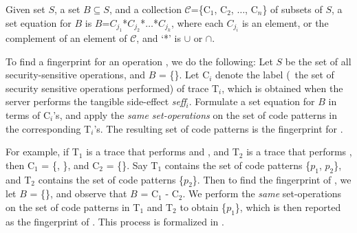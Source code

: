 \begin{definition}
\label{definition:set-equation}
Given set $S$, a set $B\subseteq$$S$, and a collection $\mathcal{C}$=\{C$_1$,
C$_2$, $\ldots$, C$_n$\} of subsets of $S$, a set equation for $B$ is
$B$=$C_{j_1}$*$C_{j_2}$*$\ldots$*$C_{j_k}$, where each $C_{j_i}$ is an element,
or the complement of an element of $\mathcal{C}$, and `*' is $\cup$ or $\cap$.
\end{definition}

To find a fingerprint for an operation , we do the following: Let $S$ be
the set of all security-sensitive operations, and $B$ = \{\}.  Let C$_i$
denote the label (\ie~the set of security sensitive operations performed) of
trace T$_i$, which is obtained when the server performs the tangible
side-effect \textit{seff$_i$}. Formulate a set equation for $B$ in terms of
C$_i$'s, and apply the \textit{same set-operations} on the set of code patterns
in the corresponding T$_i$'s. The resulting set of code patterns is the
fingerprint for . 

For example, if T$_1$ is a trace that performs  and ,
and T$_2$ is a trace that performs , then C$_1$ = \{,
\}, and C$_2$ = \{\}. Say T$_1$ contains the
set of code patterns \{$p_1$, $p_2$\}, and T$_2$ contains the set of code
patterns \{$p_2$\}. Then to find the fingerprint of , we let $B$ =
\{\}, and observe that $B$ = C$_1$ - C$_2$. We perform the \textit{same}
set-operations on the set of code patterns in T$_1$ and T$_2$ to obtain
\{$p_1$\}, which is then reported as the fingerprint of . This process
is formalized in .


